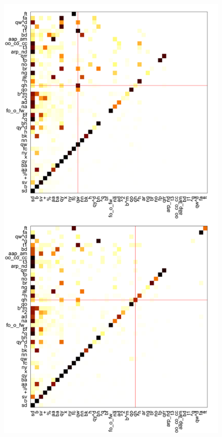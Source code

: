 \documentclass[11pt,a4paper]{article}
\begin{document}


  \begin{figure}[h!]
  \centering
  \vspace*{-0.3cm}
    \fontsize{6}{10}\selectfont
%      
   \includegraphics[width=.9\linewidth]{img/swda-cm.pdf}

\end{figure}
\end{document}
